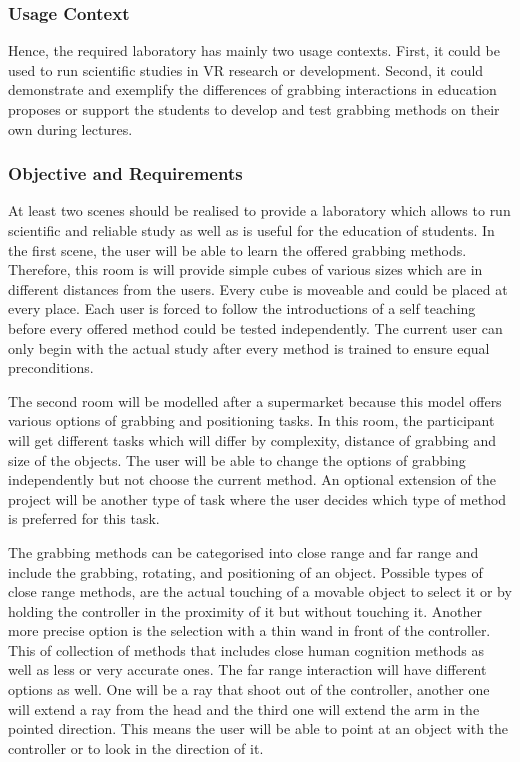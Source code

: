 \subsubsection{Usage Context}\label{sec:PMUsageContext} 
Hence, the required laboratory has mainly two usage contexts. First, it could be used to run scientific studies in VR research or development. Second, it could demonstrate and exemplify the differences of grabbing interactions in education proposes or support the students to develop and test grabbing methods on their own during lectures. 

\subsubsection{Objective and Requirements}\label{sec:PMRequirements}

At least two scenes should be realised to provide a laboratory which allows to run scientific and reliable study as well as is useful for the education of students. In the first scene, the user will be able to learn the offered grabbing methods. Therefore, this room is will provide simple cubes of various sizes which are in different distances from the users. Every cube is moveable and could be placed at every place. Each user is forced to follow the introductions of a self teaching before every offered method could be tested independently. The current user can only begin with the actual study after every method is trained to ensure equal preconditions.

The second room will be modelled after a supermarket because this model offers various options of grabbing and positioning tasks. In this room, the participant will get different tasks which will differ by complexity, distance of grabbing and size of the objects. The user will be able to change the options of grabbing independently but not choose the current method. An optional extension of the project will be another type of task where the user decides which type of method is preferred for this task.

The grabbing methods can be categorised into close range and far range and include the grabbing, rotating, and positioning of an object. Possible types of close range methods, are the actual touching of a movable object to select it or by holding the controller in the proximity of it but without touching it. Another more precise option is the selection with a thin wand in front of the controller. This of collection of methods that includes close human cognition methods as well as less or very accurate ones. 
The far range interaction will have different options as well. One will be a ray that shoot out of the controller, another one will extend a ray from the head and the third one will extend the arm in the pointed direction. This means the user will be able to point at an object with the controller or to look in the direction of it.

